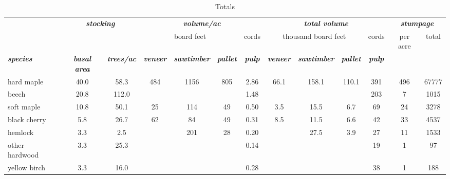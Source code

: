 \documentclass[landscape]{article}
\begin{document}
\begin{table}[H]

\caption{\label{tab:unnamed-chunk-23}Totals}
\fontsize{10}{12}\selectfont
\begin{tabular}[t]{lcccccccccccc}
\toprule
\multicolumn{1}{c}{\em{\textbf{ }}} & \multicolumn{2}{c}{\em{\textbf{stocking}}} & \multicolumn{4}{c}{\em{\textbf{volume/ac }}} & \multicolumn{4}{c}{\em{\textbf{total volume}}} & \multicolumn{2}{c}{\em{\textbf{stumpage}}} \\
\cmidrule(l{3pt}r{3pt}){2-3} \cmidrule(l{3pt}r{3pt}){4-7} \cmidrule(l{3pt}r{3pt}){8-11} \cmidrule(l{3pt}r{3pt}){12-13}
\multicolumn{3}{c}{ } & \multicolumn{3}{c}{board feet} & \multicolumn{1}{c}{cords} & \multicolumn{3}{c}{thousand board feet} & \multicolumn{1}{c}{cords} & \multicolumn{1}{c}{per acre} & \multicolumn{1}{c}{total} \\
\cmidrule(l{3pt}r{3pt}){4-6} \cmidrule(l{3pt}r{3pt}){7-7} \cmidrule(l{3pt}r{3pt}){8-10} \cmidrule(l{3pt}r{3pt}){11-11} \cmidrule(l{3pt}r{3pt}){12-12} \cmidrule(l{3pt}r{3pt}){13-13}
\rowcolor[HTML]{DCDCDC}  \em{\textbf{species}} & \em{\textbf{basal area}} & \em{\textbf{trees/ac}} & \em{\textbf{veneer}} & \em{\textbf{sawtimber}} & \em{\textbf{pallet}} & \em{\textbf{pulp}} & \em{\textbf{veneer}} & \em{\textbf{sawtimber}} & \em{\textbf{pallet}} & \em{\textbf{pulp}} & \em{\textbf{ }} & \em{\textbf{ }}\\
\midrule
\rowcolor{gray!6}  hard maple & 40.0 & 58.3 & 484 & 1156 & 805 & 2.86 & 66.1 & 158.1 & 110.1 & 391 & 496 & 67777\\
 
beech & 20.8 & 112.0 &  &  &  & 1.48 &  &  &  & 203 & 7 & 1015\\
 
\rowcolor{gray!6}  soft maple & 10.8 & 50.1 & 25 & 114 & 49 & 0.50 & 3.5 & 15.5 & 6.7 & 69 & 24 & 3278\\
 
black cherry & 5.8 & 26.7 & 62 & 84 & 49 & 0.31 & 8.5 & 11.5 & 6.6 & 42 & 33 & 4537\\
 
\rowcolor{gray!6}  hemlock & 3.3 & 2.5 &  & 201 & 28 & 0.20 &  & 27.5 & 3.9 & 27 & 11 & 1533\\
 
other hardwood & 3.3 & 25.3 &  &  &  & 0.14 &  &  &  & 19 & 1 & 97\\
 
\rowcolor{gray!6}  yellow birch & 3.3 & 16.0 &  &  &  & 0.28 &  &  &  & 38 & 1 & 188\\
 

\end{tabular}
\end{table}
\end{document}
